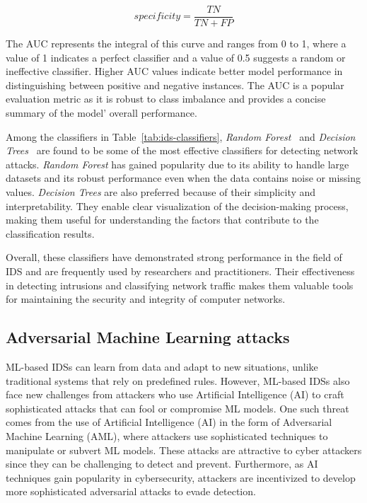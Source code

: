 \[specificity = \frac{TN}{TN + FP}\]

The AUC represents the integral of this curve and ranges from 0 to 1, where a value of 1 indicates a perfect classifier
and a value of 0.5 suggests a random or ineffective classifier.
Higher AUC values indicate better model performance in distinguishing between positive and negative instances.
The AUC is a popular evaluation metric as it is robust to class imbalance and provides a concise summary of the model'
overall performance.

Among the classifiers in Table~\ref{tab:ids-classifiers}, \textit{Random Forest}~\cite{zhang2008random} and
\textit{Decision Trees}~\cite{amor2004naive} are found to be some of the most effective classifiers for detecting network attacks.
\textit{Random Forest} has gained popularity due to its ability to handle large datasets and its robust performance even when
the data contains noise or missing values.
\textit{Decision Trees} are also preferred because of their simplicity and interpretability.
They enable clear visualization of the decision-making process, making them useful for understanding the factors that
contribute to the classification results.

Overall, these classifiers have demonstrated strong performance in the field of IDS and are frequently used by
researchers and practitioners.
Their effectiveness in detecting intrusions and classifying network traffic makes them valuable tools for maintaining
the security and integrity of computer networks.

\subsection{Adversarial Machine Learning attacks}\label{subsec:adversarial-machine-learning-attacks}

ML-based IDSs can learn from data and adapt to new situations, unlike traditional systems that rely on predefined rules.
However, ML-based IDSs also face new challenges from attackers who use Artificial Intelligence (AI) to craft
sophisticated attacks that can fool or compromise ML models.
One such threat comes from the use of Artificial Intelligence (AI) in the form of Adversarial Machine Learning (AML),
where attackers use sophisticated techniques to manipulate or subvert ML models.
These attacks are attractive to cyber attackers since they can be challenging to detect and prevent.
Furthermore, as AI techniques gain popularity in cybersecurity, attackers are incentivized to develop more
sophisticated adversarial attacks to evade detection.

